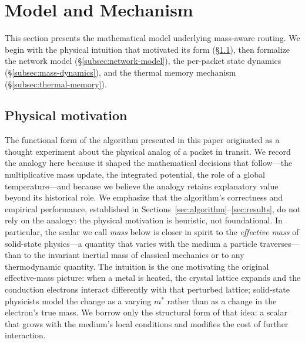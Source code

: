 %

\section{Model and Mechanism}
\label{sec:model}

This section presents the mathematical model underlying mass-aware
routing. We begin with the physical intuition that motivated its
form (\S\ref{subsec:physical-motivation}), then formalize the network
model (\S\ref{subsec:network-model}), the per-packet state dynamics
(\S\ref{subsec:mass-dynamics}), and the thermal memory mechanism
(\S\ref{subsec:thermal-memory}).

\subsection{Physical motivation}
\label{subsec:physical-motivation}

The functional form of the algorithm presented in this paper
originated as a thought experiment about the physical analog of a
packet in transit. We record the analogy here because it shaped the
mathematical decisions that follow---the multiplicative mass update,
the integrated potential, the role of a global temperature---and
because we believe the analogy retains explanatory value beyond its
historical role. We emphasize that the algorithm's correctness and
empirical performance, established in
Sections~\ref{sec:algorithm}--\ref{sec:results}, do not rely on the
analogy: the physical motivation is heuristic, not foundational. In
particular, the scalar we call \emph{mass} below is closer in spirit
to the \emph{effective mass} of solid-state physics---a quantity that
varies with the medium a particle traverses---than to the invariant
inertial mass of classical mechanics or to any thermodynamic quantity.
The intuition is the one motivating the original effective-mass
picture: when a metal is heated, the crystal lattice expands and the
conduction electrons interact differently with that perturbed lattice;
solid-state physicists model the change as a varying $m^{*}$ rather
than as a change in the electron's true mass. We borrow only the
structural form of that idea: a scalar that grows with the medium's
local conditions and modifies the cost of further interaction.

